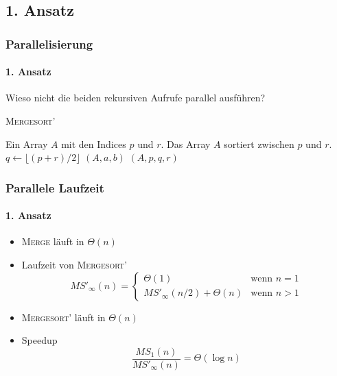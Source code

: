 \subsection{1. Ansatz}
\begin{frame}
    \frametitle{Parallelisierung}
    \framesubtitle{1. Ansatz}
    Wieso nicht die beiden rekursiven Aufrufe parallel ausführen?
    \begin{algorithm}[H]
        \caption{{\rmfamily \textsc{Mergesort'}} \cite[S.34]{cormen}}
        \label{alg:mergesort}
        \begin{algorithmic}[1]
            \Require Ein Array $A$ mit den Indices $p$ und $r$.
            \Ensure Das Array $A$ sortiert zwischen $p$ und $r$.
                \State $q \gets \lfloor (p + r) / 2 \rfloor$
                    $(A, a, b)$
                \EndParDo
                $(A, p, q, r)$
            \EndIf
        \end{algorithmic}
    \end{algorithm}
\end{frame}

\begin{frame}
    \frametitle{Parallele Laufzeit}
    \framesubtitle{1. Ansatz}
    \begin{itemize}
        \item {\rmfamily \textsc{Merge}} läuft in $\Theta(n)$
        \item Laufzeit von {\rmfamily \textsc{Mergesort'}}
            \begin{equation}
                MS'_\infty(n) = \begin{cases}
                    \Theta(1) & \text{wenn } n = 1 \\
                    MS'_\infty(n/2) + \Theta(n) & \text{wenn } n > 1
                \end{cases}
            \end{equation}
        \item {\rmfamily \textsc{Mergesort'}} läuft in $\Theta(n)$
        \item Speedup
            \begin{equation}
                \frac{MS_1(n)}{MS'_\infty(n)} = \Theta(\log n)
            \end{equation}
    \end{itemize}
\end{frame}


